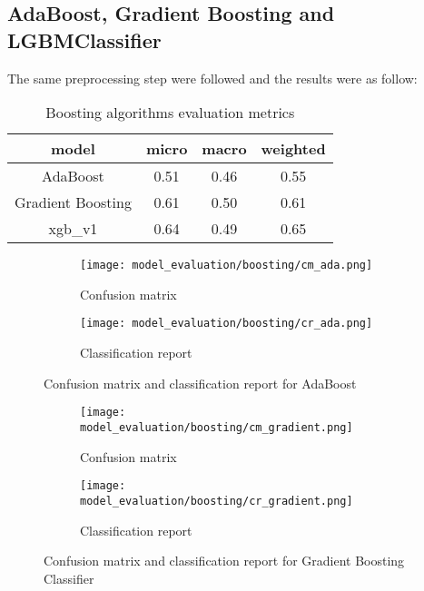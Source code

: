 \subsection{AdaBoost, Gradient Boosting and LGBMClassifier}
The same preprocessing step were followed and the results were as follow:


\begin{table}[H]
    \begin{center}
        \begin{tabular}{ |c|c|c|c| }
            \hline
            model   & micro & macro & weighted \\
            \hline
            AdaBoost & 0.51  & 0.46  & 0.55     \\
            \hline
            Gradient Boosting & 0.61  & 0.50  & 0.61     \\
            \hline
            xgb\_v1 & 0.64  & 0.49  & 0.65     \\
            \hline
        \end{tabular}
    \end{center}
    \caption{Boosting algorithms evaluation metrics}
\end{table}

\begin{figure}[H]
    \centering
    \begin{subfigure}[b]{0.5\textwidth}
        \texttt{[image: model\_evaluation/boosting/cm\_ada.png]}
        \caption{Confusion matrix}
    \end{subfigure}
    \hfill
    \begin{subfigure}[b]{0.4\textwidth}
        \texttt{[image: model\_evaluation/boosting/cr\_ada.png]}
        \caption{Classification report}
    \end{subfigure}
    \caption{Confusion matrix and classification report for AdaBoost}
\end{figure}

\begin{figure}[H]
    \centering
    \begin{subfigure}[b]{0.5\textwidth}
        \texttt{[image: model\_evaluation/boosting/cm\_gradient.png]}
        \caption{Confusion matrix}
    \end{subfigure}
    \hfill
    \begin{subfigure}[b]{0.4\textwidth}
        \texttt{[image: model\_evaluation/boosting/cr\_gradient.png]}
        \caption{Classification report}
    \end{subfigure}
    \caption{Confusion matrix and classification report for Gradient Boosting Classifier}
\end{figure}

